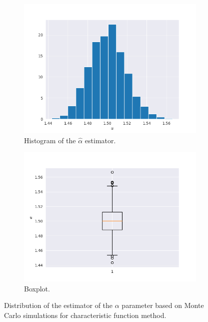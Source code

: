 \documentclass{article}
\begin{document}
		\subsubsection{}
		\begin{figure}[H]
			\begin{subfigure}{.5\textwidth}
				\centering
				\includegraphics[width=1\linewidth]{images/cf_alpha_hist.png}
				\caption{Histogram of the $\hat\alpha$ estimator.}
			\end{subfigure}
			\begin{subfigure}[r]{.5\textwidth}
				\centering
				\includegraphics[width=1\linewidth]{images/cf_alpha_boxplot.png}
				\caption{Boxplot.}
			\end{subfigure}
			\caption{Distribution of the estimator of the $\alpha$ parameter based on Monte Carlo simulations for characteristic function method.}\label{alpha1}
		\end{figure}
\end{document}
